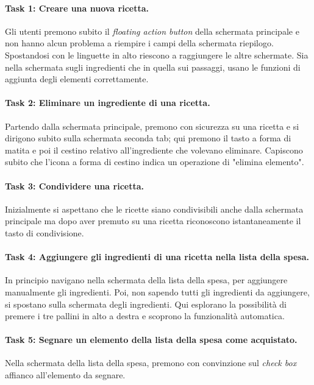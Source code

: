 \paragraph{Task 1: Creare una nuova ricetta.}
Gli utenti premono subito il \textit{floating action button} della schermata principale e non hanno alcun problema a riempire i campi della schermata riepilogo.
Spostandosi con le linguette in alto riescono a raggiungere le altre schermate.
Sia nella schermata sugli ingredienti che in quella sui passaggi, usano le funzioni di aggiunta degli elementi correttamente.

\paragraph{Task 2: Eliminare un ingrediente di una ricetta.}
Partendo dalla schermata principale, premono con sicurezza su una ricetta e si dirigono subito sulla schermata seconda tab; qui premono il tasto a forma di matita e poi il cestino relativo all'ingrediente che volevano eliminare.
Capiscono subito che l'icona a forma di cestino indica un operazione di "elimina elemento".

\paragraph{Task 3: Condividere una ricetta.}
Inizialmente si aspettano che le ricette siano condivisibili anche dalla schermata principale ma dopo aver premuto su una ricetta riconoscono istantaneamente il tasto di condivisione.

\paragraph{Task 4: Aggiungere gli ingredienti di una ricetta nella lista della spesa.}
In principio navigano nella schermata della lista della spesa, per aggiungere manualmente gli ingredienti.
Poi, non sapendo tutti gli ingredienti da aggiungere, si spostano sulla schermata degli ingredienti.
Qui esplorano la possibilità di premere i tre pallini in alto a destra e scoprono la funzionalità automatica.

\paragraph{Task 5: Segnare un elemento della lista della spesa come acquistato.}
Nella schermata della lista della spesa, premono con convinzione sul \textit{check box} affianco all'elemento da segnare.

